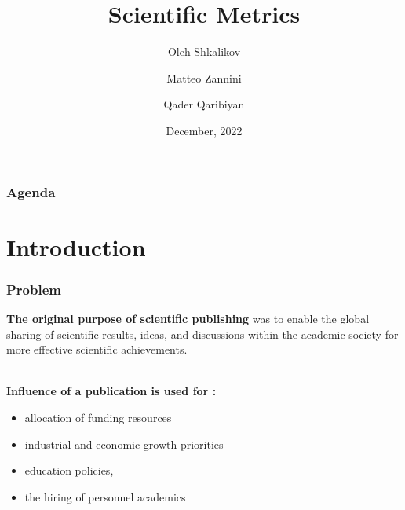 \documentclass{beamer}
\title[Scientific metrics]{Scientific Metrics}
\author[O. Shkalikov \and M. Zannini \and Q.Qaribiyan]
{Oleh Shkalikov \and Matteo Zannini \and Qader Qaribiyan}
\institute[]{TU Dresden, Computer Science Faculty}
\date{December, 2022}
\begin{document}
\frame{\titlepage}

\begin{frame}
    \frametitle{Agenda}
    \tableofcontents
\end{frame}

\section{Introduction}

\begin{frame}

    \frametitle{Problem}

    \textbf{The original purpose of scientific publishing} was to enable the global sharing of scientific results, ideas, and discussions within the academic society for more effective scientific achievements.\\~\

     \textbf{Influence of a publication is used for :}

\begin{itemize}
   \item allocation of funding resources
   \item industrial and economic growth priorities
   \item  education policies, 
   \item  the hiring of personnel academics
\end{itemize}

\end{frame}
\end{document}
